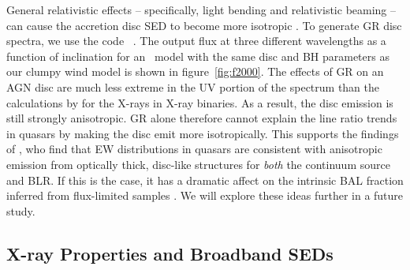 \documentclass[useAMS,usenatbib]{mn2e_x}
\begin{document}
General relativistic effects -- specifically, light bending
and relativistic beaming -- can cause 
the accretion disc SED to become more isotropic \citep[e.g.][]{zhang1997,munozdarias2013}.
To generate GR disc spectra, we use the code \agn\ \citep{hubeny2000,davishubeny2006,davis2007}. 
The output flux at three different wavelengths
as a function of inclination for an \agn\ model with the same disc and BH parameters
as our clumpy wind model is shown in figure~\ref{fig:f2000}.
The effects of GR on an AGN disc are much less extreme 
in the UV portion of the spectrum than the calculations
by \cite{zhang1997} for the X-rays in X-ray binaries.
As a result, the disc emission is still strongly anisotropic.
GR alone therefore cannot explain the line ratio trends in quasars by making the disc
emit more isotropically. This supports the findings of \cite{risaliti2011}, 
who find that EW distributions in quasars are consistent with anisotropic emission 
from optically thick, 
disc-like structures for {\em both} the continuum source and BLR. 
If this is the case, it has a dramatic affect on the intrinsic
BAL fraction inferred from flux-limited samples \citep{goodrich1997,krolikvoit1998}.
We will explore these ideas further in a future study.



\subsection{X-ray Properties and Broadband SEDs}
\end{document}
